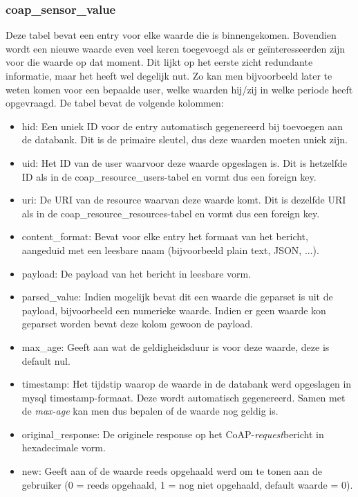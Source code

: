 \subsubsection{coap\_sensor\_value}
Deze tabel bevat een entry voor elke waarde die is binnengekomen. Bovendien wordt een nieuwe waarde even veel keren toegevoegd als er ge\"{i}nteresseerden zijn voor die waarde op dat moment. Dit lijkt op het eerste zicht redundante informatie, maar het heeft wel degelijk nut. Zo kan men bijvoorbeeld later te weten komen voor een bepaalde user, welke waarden hij/zij in welke periode heeft opgevraagd. De tabel bevat de volgende kolommen:
\begin{itemize}
\item hid: Een uniek ID voor de entry automatisch gegenereerd bij toevoegen aan de databank. Dit is de primaire sleutel, dus deze waarden moeten uniek zijn.
\item uid: Het ID van de user waarvoor deze waarde opgeslagen is. Dit is hetzelfde ID als in de coap\_resource\_users-tabel en vormt dus een foreign key.
\item uri: De URI van de resource waarvan deze waarde komt. Dit is dezelfde URI als in de coap\_resource\_resources-tabel en vormt dus een foreign key.
\item content\_format: Bevat voor elke entry het formaat van het bericht, aangeduid met een leesbare naam (bijvoorbeeld plain text, JSON, ...). 
\item payload: De payload van het bericht in leesbare vorm.
\item parsed\_value: Indien mogelijk bevat dit een waarde die geparset is uit de payload, bijvoorbeeld een numerieke waarde. Indien er geen waarde kon geparset worden bevat deze kolom gewoon de payload.
\item max\_age: Geeft aan wat de geldigheidsduur is voor deze waarde, deze is default nul.
\item timestamp: Het tijdstip waarop de waarde in de databank werd opgeslagen in mysql timestamp-formaat. Deze wordt automatisch gegenereerd. Samen met de \textit{max-age} kan men dus bepalen of de waarde nog geldig is.
\item original\_response: De originele response op het CoAP-\textit{request}bericht in hexadecimale vorm.
\item new: Geeft aan of de waarde reeds opgehaald werd om te tonen aan de gebruiker (0 = reeds opgehaald, 1 = nog niet opgehaald, default waarde = 0).
\end{itemize}


